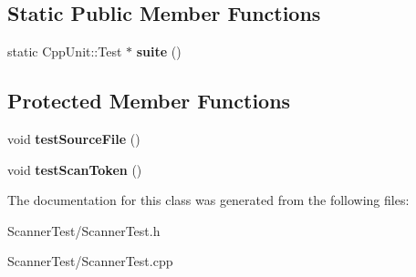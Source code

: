 \subsection*{Static Public Member Functions}
\begin{DoxyCompactItemize}
\item 
static Cpp\+Unit\+::\+Test $\ast$ {\bfseries suite} ()\hypertarget{class_scanner_1_1_scanner_test_a8259a1f3d89271f51bbadba89bd32395}{}\label{class_scanner_1_1_scanner_test_a8259a1f3d89271f51bbadba89bd32395}

\end{DoxyCompactItemize}
\subsection*{Protected Member Functions}
\begin{DoxyCompactItemize}
\item 
void {\bfseries test\+Source\+File} ()\hypertarget{class_scanner_1_1_scanner_test_aa322e116bb9ea87b9de421b4b48541ed}{}\label{class_scanner_1_1_scanner_test_aa322e116bb9ea87b9de421b4b48541ed}

\item 
void {\bfseries test\+Scan\+Token} ()\hypertarget{class_scanner_1_1_scanner_test_aefc9257a6d9d9f77bf6d9d67eec8fb48}{}\label{class_scanner_1_1_scanner_test_aefc9257a6d9d9f77bf6d9d67eec8fb48}

\end{DoxyCompactItemize}


The documentation for this class was generated from the following files\+:\begin{DoxyCompactItemize}
\item 
Scanner\+Test/Scanner\+Test.\+h\item 
Scanner\+Test/Scanner\+Test.\+cpp\end{DoxyCompactItemize}

